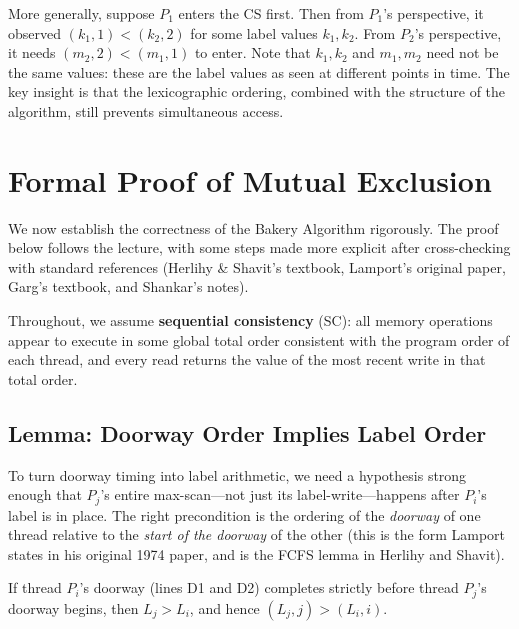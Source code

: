 More generally, suppose $P_1$ enters the CS first. Then from $P_1$'s perspective,
it observed $(k_1, 1) < (k_2, 2)$ for some label values $k_1, k_2$. From
$P_2$'s perspective, it needs $(m_2, 2) < (m_1, 1)$ to enter. Note that
$k_1, k_2$ and $m_1, m_2$ need not be the same values: these are the label
values as seen at different points in time. The key insight is that the
lexicographic ordering, combined with the structure of the algorithm, still
prevents simultaneous access.

\section{Formal Proof of Mutual Exclusion}

We now establish the correctness of the Bakery Algorithm rigorously. The proof
below follows the lecture, with some steps made more explicit after
cross-checking with standard references (Herlihy \& Shavit's textbook,
Lamport's original paper, Garg's textbook, and Shankar's notes).

Throughout, we assume \textbf{sequential consistency} (SC): all memory
operations appear to execute in some global total order consistent with the
program order of each thread, and every read returns the value of the most
recent write in that total order.

\subsection{Lemma: Doorway Order Implies Label Order}

To turn doorway timing into label arithmetic, we need a hypothesis strong
enough that $P_j$'s entire max-scan---not just its label-write---happens after
$P_i$'s label is in place. The right precondition is the ordering of the
\emph{doorway} of one thread relative to the \emph{start of the doorway} of
the other (this is the form Lamport states in his original 1974 paper, and is
the FCFS lemma in Herlihy and Shavit).

\begin{lemma}\label{lem:label-order}
If thread $P_i$'s doorway (lines D1 and D2) completes strictly before thread
$P_j$'s doorway begins, then $L_j > L_i$, and hence
$(L_j, j) > (L_i, i)$.
\end{lemma}

